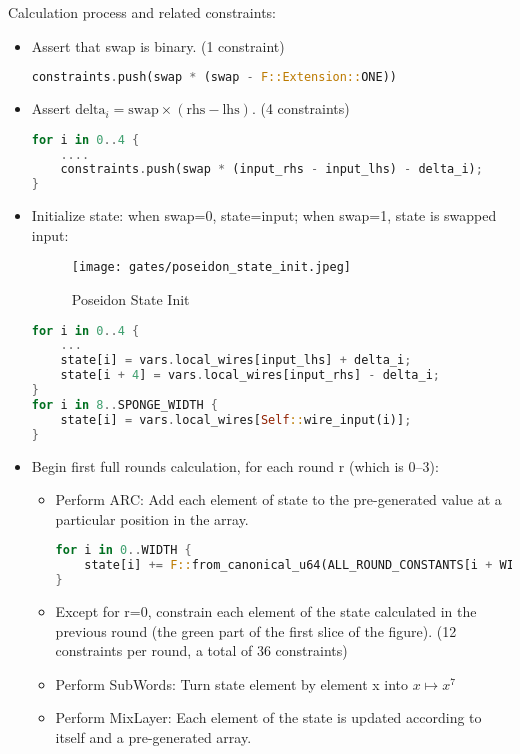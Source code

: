 Calculation process and related constraints:
\begin{itemize}
    \item Assert that swap is binary. (1 constraint)
    \begin{lstlisting}[language=rust]
constraints.push(swap * (swap - F::Extension::ONE))
    \end{lstlisting}
    \item Assert $\text{delta}_i = \text{swap} \times (\text{rhs} - \text{lhs})$. (4 constraints)
    \begin{lstlisting}[language=rust]
for i in 0..4 {
    ....
    constraints.push(swap * (input_rhs - input_lhs) - delta_i);
}
    \end{lstlisting}
    \item Initialize state: when swap=0, state=input; when swap=1, state is swapped input:
    \begin{figure}[!ht]
        \centering
        \texttt{[image: gates/poseidon\_state\_init.jpeg]}
        \caption{Poseidon State Init}
        \label{fig:poseidon-state-init}
    \end{figure}
    \begin{lstlisting}[language=rust]
for i in 0..4 {
    ...
    state[i] = vars.local_wires[input_lhs] + delta_i;
    state[i + 4] = vars.local_wires[input_rhs] - delta_i;
}
for i in 8..SPONGE_WIDTH {
    state[i] = vars.local_wires[Self::wire_input(i)];
}
    \end{lstlisting}
    \item Begin first full rounds calculation, for each round r (which is 0--3):
    \begin{itemize}
        \item Perform ARC: Add each element of state to the pre-generated value at a particular position in the array.
        \begin{lstlisting}[language=rust]
for i in 0..WIDTH {
    state[i] += F::from_canonical_u64(ALL_ROUND_CONSTANTS[i + WIDTH * round_ctr]);
}
        \end{lstlisting}
        \item Except for r=0, constrain each element of the state calculated in the previous round (the green part of the first slice of the figure). 
        (12 constraints per round, a total of 36 constraints)
        \item Perform SubWords: Turn state element by element x into $x \mapsto x^7$
        \item Perform MixLayer: Each element of the state is updated according to itself and a pre-generated array.

\end{itemize}
\end{itemize}
